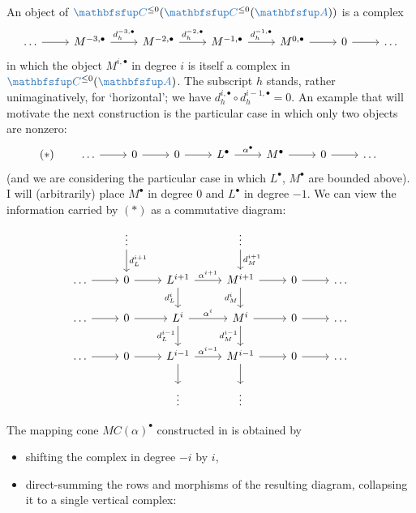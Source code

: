 An object of $\categ{C}^{\le 0}(\categ{C}^{\le 0}(\categ{A}))$ is a
complex
\[\begin{tikzcd}
    \dots \arrow[r] & M^{-3,\bullet} \arrow[r, "d_h^{-3,\bullet}"] &
    M^{-2,\bullet} \arrow[r, "d_h^{-2,\bullet}"] & M^{-1,\bullet}
    \arrow[r, "d_h^{-1,\bullet}"] & M^{0,\bullet} \arrow[r] & 0
    \arrow[r] & \dots
  \end{tikzcd}\] in which the object $M^{i,\bullet}$ in degree $i$ is
itself a complex in $\categ{C}^{\le 0}(\categ{A})$. The subscript $h$
stands, rather unimaginatively, for `horizontal'; we have
$d_h^{i,\bullet} \circ d_h^{i-1,\bullet} = 0$. An example that will
motivate the next construction is the particular case in which only
two objects are nonzero:
\[
  (*) \qquad
  \begin{tikzcd}
    \dots \arrow[r] & 0 \arrow[r] & 0 \arrow[r] & L^\bullet \arrow[r,
    "\alpha^\bullet"] & M^\bullet \arrow[r] & 0 \arrow[r] & \dots
  \end{tikzcd}
\]
(and we are considering the particular case in which $L^\bullet$,
$M^\bullet$ are bounded above). I will (arbitrarily) place $M^\bullet$
in degree $0$ and $L^\bullet$ in degree $-1$. We can view the
information carried by $(*)$ as a commutative diagram:
\[\begin{tikzcd}
    & \vdots \arrow[d, "d_L^{i+1}"] & & \vdots \arrow[d, "d_M^{i+1}"] & \\
    \dots \arrow[r] & 0 \arrow[r] & L^{i+1} \arrow[r, "\alpha^{i+1}"]
    \arrow[d, "d_L^i"'] & M^{i+1} \arrow[r] \arrow[d, "d_M^i"'] & 0
    \arrow[r] & \dots \\
    \dots \arrow[r] & 0 \arrow[r] & L^i \arrow[r, "\alpha^i"]
    \arrow[d, "d_L^{i-1}"'] & M^i \arrow[r] \arrow[d, "d_M^{i-1}"'] &
    0 \arrow[r]
    & \dots \\
    \dots \arrow[r] & 0 \arrow[r] & L^{i-1} \arrow[r, "\alpha^{i-1}"]
    \arrow[d] & M^{i-1} \arrow[r] \arrow[d] & 0 \arrow[r] & \dots \\
    & & \vdots & \vdots &
  \end{tikzcd}\]

The mapping cone $MC(\alpha)^\bullet$ constructed in
 is obtained by
\begin{itemize}
\item shifting the complex in degree $-i$ by $i$,
\item direct-summing the rows and morphisms of the resulting diagram,
  collapsing it to a single vertical complex:
\end{itemize}

